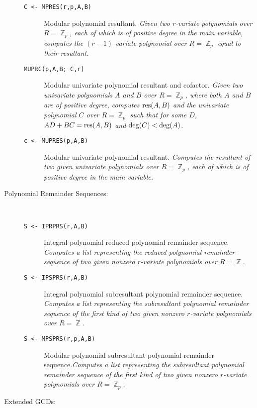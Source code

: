 \begin{description}
\begin{description}
    \item[{\tt C <- MPRES(r,p,A,B) 
}] Modular polynomial resultant. {\em Given two
$r$-variate polynomials over $R = \BbbZ_p$, each of which is
of positive degree in the main variable, computes the $(r-1)$-variate
polynomial over $R = \BbbZ_p$ equal to their resultant.}

    \item[{\tt  MUPRC(p,A,B; C,r) 
}] Modular univariate polynomial resultant and cofactor.
{\em Given two univariate polynomials $A$ and $B$ over $R = \BbbZ_p$,
where both $A$ and $B$ are of positive degree, computes ${\rm
res}(A,B)$ and the univariate polynomial $C$ over $R = \BbbZ_p$ such
that for some $D$, $AD + BC = {\rm res}(A,B)$ and ${\rm deg}(C) < {\rm
deg}(A)$.}

    \item[{\tt c <- MUPRES(p,A,B) 
}] Modular univariate polynomial resultant. {\em
Computes the resultant of two given univariate polynomials over $R =
\BbbZ_p$, each of which is of positive degree in the main variable.}

  \end{description}

\item[Polynomial Remainder Sequences:] \ \
  \begin{description}

    \item[{\tt S <- IPRPRS(r,A,B) 
}] Integral polynomial reduced polynomial remainder
sequence. {\em Computes a list representing the reduced polynomial
remainder sequence of two given nonzero $r$-variate polynomials over $R =
\BbbZ$.}

    \item[{\tt S <- IPSPRS(r,A,B) 
}] Integral polynomial subresultant polynomial
remainder sequence. {\em Computes a list representing the subresultant
polynomial remainder sequence of the first kind of two given nonzero
$r$-variate polynomials over $R = \BbbZ$.}

    \item[{\tt S <- MPSPRS(r,p,A,B) 
}] Modular polynomial subresultant polynomial remainder
sequence.{\em Computes a list representing the subresultant polynomial
remainder sequence of the first kind of two given nonzero $r$-variate
polynomials over $R = \BbbZ_p$.}

  \end{description}

\item[Extended GCDs:] \ \
  \begin{description}


\end{description}
\end{description}
